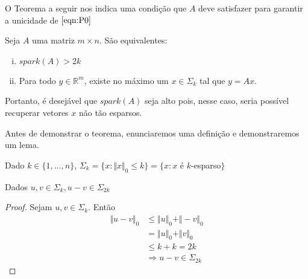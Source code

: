 O Teorema a seguir nos indica uma condição que $A$ deve satisfazer para garantir a unicidade de $\eqref{eqn:P0}$

\begin{teorema}
\label{thm:unicidade_P0}
Seja $A$ uma matriz $m \times n$. São equivalentes:

\begin{enumerate}[(i)]
\item $\textit{spark}(A)> 2k$

\item Para todo $y \in \mathbb{R}^m$, existe no máximo um $x \in \Sigma_k$ tal que $y = Ax$.
\end{enumerate}
\end{teorema}

Portanto, é desejável que $\textit{spark}(A)$ seja alto pois, nesse caso, seria possível recuperar vetores $x$ não tão esparsos.

Antes de demonstrar o teorema, enunciaremos uma definição e demonstraremos um lema.

\begin{definicao}
Dado $k \in \lbrace 1, \hdots , n \rbrace$,
$ \Sigma_k = \lbrace x : \Vert x \Vert_{0} \leq k \rbrace
           = \lbrace x : x $ é $k$-esparso$ \rbrace$
\end{definicao}

\begin{lema}
Dados $u, v \in \Sigma_k, u - v \in \Sigma_{2k}$
\end{lema}
\begin{proof}
Sejam $u, v \in \Sigma_k$. Então
\begin{subequations}
\begin{align*}
\Vert u - v \Vert_0 & \leq \Vert u \Vert_0 + \Vert -v \Vert_0 \\
& = \Vert u \Vert_0 + \Vert v \Vert_0 \\
& \leq k + k = 2k \\
& \Rightarrow u - v \in \Sigma_{2k}
\end{align*}
\end{subequations}
\end{proof}

